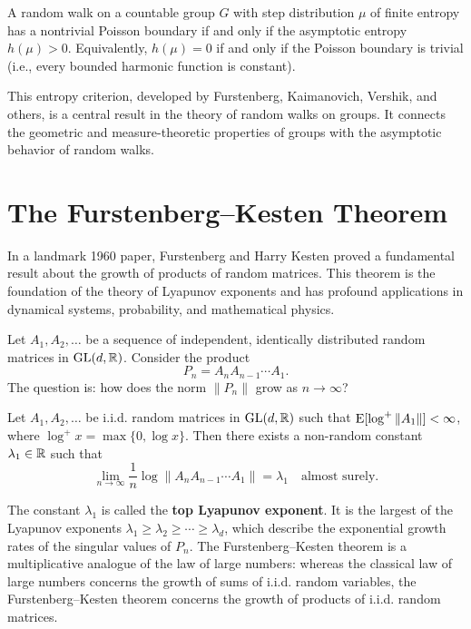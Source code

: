\begin{theorem}
A random walk on a countable group \(G\) with step distribution \(\mu\) of finite entropy has a nontrivial Poisson boundary if and only if the asymptotic entropy \(h(\mu) > 0\). Equivalently, \(h(\mu) = 0\) if and only if the Poisson boundary is trivial (i.e., every bounded harmonic function is constant).
\end{theorem}

This entropy criterion, developed by Furstenberg, Kaimanovich, Vershik, and others, is a central result in the theory of random walks on groups. It connects the geometric and measure-theoretic properties of groups with the asymptotic behavior of random walks.

\section{The Furstenberg--Kesten Theorem}

In a landmark 1960 paper, Furstenberg and Harry Kesten proved a fundamental result about the growth of products of random matrices. This theorem is the foundation of the theory of Lyapunov exponents and has profound applications in dynamical systems, probability, and mathematical physics.

Let \(A_1, A_2, \dots\) be a sequence of independent, identically distributed random matrices in \(\operatorname{GL}(d,\mathbb{R})\). Consider the product
\[
P_n = A_n A_{n-1} \cdots A_1.
\]
The question is: how does the norm \(\|P_n\|\) grow as \(n \to \infty\)?

\begin{theorem}
Let \(A_1, A_2, \dots\) be i.i.d. random matrices in \(\operatorname{GL}(d,\mathbb{R})\) such that \(\operatorname{E}[\log^+ \|A_1\|] < \infty\), where \(\log^+ x = \max\{0, \log x\}\). Then there exists a non-random constant \(\lambda_1 \in \mathbb{R}\) such that
\[
\lim_{n \to \infty} \frac{1}{n} \log \|A_n A_{n-1} \cdots A_1\| = \lambda_1 \quad \text{almost surely.}
\]
\end{theorem}

The constant \(\lambda_1\) is called the \textbf{top Lyapunov exponent}. It is the largest of the Lyapunov exponents \(\lambda_1 \geq \lambda_2 \geq \cdots \geq \lambda_d\), which describe the exponential growth rates of the singular values of \(P_n\). The Furstenberg--Kesten theorem is a multiplicative analogue of the law of large numbers: whereas the classical law of large numbers concerns the growth of sums of i.i.d. random variables, the Furstenberg--Kesten theorem concerns the growth of products of i.i.d. random matrices.

